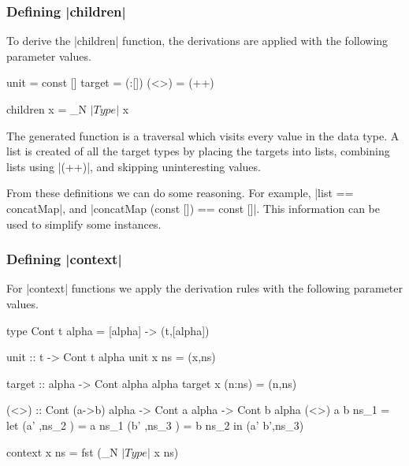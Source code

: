 \begin{comment}
To generate a particular operation we can replace the |unit|, |target| and |<>| functions with versions specific to that operation. We do this replacement using multiple copies of the template, introducing |where| clauses with local definitions of the three functions.
\end{comment}

\subsubsection{Defining |children|}

To derive the |children| function, the derivations are applied with the following parameter values.

\begin{code}
unit    = const []
target  = (:[])
(<>)    = (++)

children x = _N $| Type |$ \? x
\end{code}

The generated function is a traversal which visits every value in the data type. A list is created of all the target types by placing the targets into lists, combining lists using |(++)|, and skipping uninteresting values.

From these definitions we can do some reasoning. For example, |list == concatMap|, and |concatMap (const []) == const []|. This information can be used to simplify some instances.

\subsubsection{Defining |context|}

For |context| functions we apply the derivation rules with the following parameter values.

\begin{code}
type Cont t alpha = [alpha] -> (t,[alpha])

unit :: t -> Cont t alpha
unit x ns = (x,ns)

target :: alpha -> Cont alpha alpha
target x (n:ns) = (n,ns)

(<>) :: Cont (a->b) alpha -> Cont a alpha -> Cont b alpha
(<>) a b ns_1 =  let  (a'  ,ns_2  ) = a  ns_1
                      (b'  ,ns_3  ) = b  ns_2
                 in   (a' b',ns_3)

context x ns = fst (_N $| Type |$ \? x ns)
\end{code}

